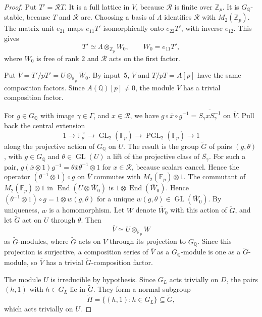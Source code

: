 \documentclass[11pt]{article}
\newcommand{\Q}{\mathbb Q}
\newcommand{\Z}{\mathbb Z}
\newcommand{\F}{\mathbb F}
\DeclareMathOperator{\End}{End}
\DeclareMathOperator{\GL}{GL}
\DeclareMathOperator{\PGL}{PGL}
\begin{document}
\begin{proof}
Put \(T'=\mathcal R T\). It is a full lattice in \(V\), because
\(\mathcal R\) is finite over \(\Z_p\). It is \(G_{\Q}\)-stable,
because \(T\) and \(\mathcal R\) are. Choosing a basis of \(\Lambda\)
identifies \(\mathcal R\) with \(M_2(\Z_p)\). The matrix unit
\(e_{21}\) maps \(e_{11}T'\) isomorphically onto \(e_{22}T'\), with
inverse \(e_{12}\). This gives
\[
 T'\simeq\Lambda\otimes_{\Z_p}W_0,\qquad W_0=e_{11}T',
\]
where \(W_0\) is free of rank \(2\) and \(\mathcal R\) acts on the
first factor.

Put \(\overline V=T'/pT'=U\otimes_{\F_p}\overline W_0\). By input~5,
\(\overline V\) and \(T/pT=A[p]\) have the same composition factors.
Since \(A(\Q)[p]\neq0\), the module \(\overline V\) has a trivial
composition factor.

For \(g\in G_{\Q}\) with image \(\gamma\in\Gamma\), and
\(x\in\mathcal R\), we have
\(g\circ\overline x\circ g^{-1}=\overline{S_\gamma xS_\gamma^{-1}}\) on
\(\overline V\). Pull back the central extension
\[
 1\longrightarrow\F_p^\times\longrightarrow\GL_2(\F_p)\longrightarrow
 \PGL_2(\F_p)\longrightarrow1
\]
along the projective action of \(G_{\Q}\) on \(U\). The result is the
group \(\widetilde G\) of pairs \((g,\theta)\), with \(g\in G_{\Q}\)
and \(\theta\in\GL(U)\) a lift of the projective class of
\(\overline{S_\gamma}\). For such a pair,
\(g(\overline x\otimes1)g^{-1}=\theta\overline x\theta^{-1}\otimes1\)
for \(x\in\mathcal R\), because scalars cancel. Hence the operator
\((\theta^{-1}\otimes1)\circ g\) on \(\overline V\) commutes with
\(M_2(\F_p)\otimes1\). The commutant of \(M_2(\F_p)\otimes1\) in
\(\End(U\otimes\overline W_0)\) is \(1\otimes\End(\overline W_0)\).
Hence \((\theta^{-1}\otimes1)\circ g=1\otimes w(g,\theta)\) for a
unique \(w(g,\theta)\in\GL(\overline W_0)\). By uniqueness, \(w\) is a
homomorphism. Let \(W\) denote \(\overline W_0\) with this action of
\(\widetilde G\), and let \(\widetilde G\) act on \(U\) through
\(\theta\). Then
\[
 \overline V\simeq U\otimes_{\F_p}W
\]
as \(\widetilde G\)-modules, where \(\widetilde G\) acts on
\(\overline V\) through its projection to \(G_{\Q}\). Since this
projection is surjective, a composition series of \(\overline V\) as a
\(G_{\Q}\)-module is one as a \(\widetilde G\)-module, so
\(\overline V\) has a trivial \(\widetilde G\)-composition factor.

The module \(U\) is irreducible by hypothesis. Since \(G_L\) acts
trivially on \(D\), the pairs \((h,1)\) with \(h\in G_L\) lie in
\(\widetilde G\). They form a normal subgroup
\[
 \widetilde H=\{(h,1):h\in G_L\}\subseteq\widetilde G,
\]
which acts trivially on \(U\).


\end{proof}
\end{document}
